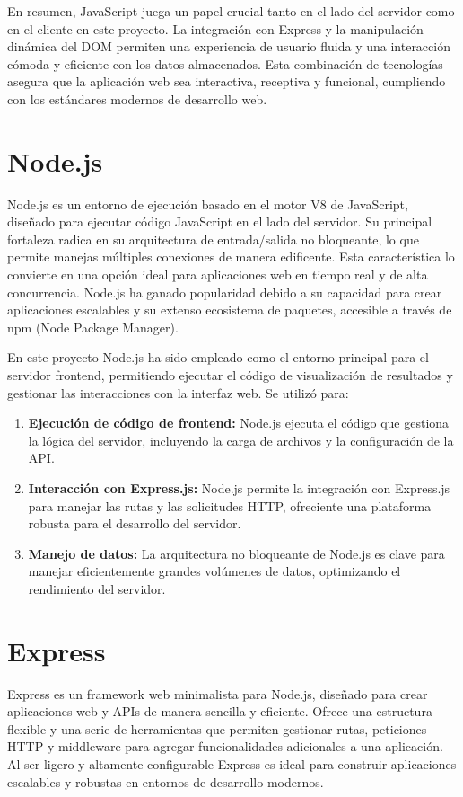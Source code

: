 \documentclass[a4paper, 12pt]{book}
\begin{document}
En resumen, JavaScript juega un papel crucial tanto en el lado del servidor como en el cliente en este proyecto. La integración con Express y la manipulación dinámica del DOM permiten una experiencia de usuario fluida y una interacción cómoda y eficiente con los datos almacenados. Esta combinación de tecnologías asegura que la aplicación web sea interactiva, receptiva y funcional, cumpliendo con los estándares modernos de desarrollo web.

\section{Node.js}
Node.js es un entorno de ejecución basado en el motor V8 de JavaScript, diseñado para ejecutar código JavaScript en el lado del servidor. Su principal fortaleza radica en su arquitectura de entrada/salida no bloqueante, lo que permite manejas múltiples conexiones de manera edificente. Esta característica lo convierte en una opción ideal para aplicaciones web en tiempo real y de alta concurrencia. Node.js ha ganado popularidad debido a su capacidad para crear aplicaciones escalables y su extenso ecosistema de paquetes, accesible a través de npm (Node Package Manager).

En este proyecto Node.js ha sido empleado como el entorno principal para el servidor frontend, permitiendo ejecutar el código de visualización de resultados y gestionar las interacciones con la interfaz web. Se utilizó para:

\begin{enumerate}
    \item \textbf{Ejecución de código de frontend:} Node.js ejecuta el código que gestiona la lógica del servidor, incluyendo la carga de archivos y la configuración de la API.
    \item \textbf{Interacción con Express.js:} Node.js permite la integración con Express.js para manejar las rutas y las solicitudes HTTP, ofreciente una plataforma robusta para el desarrollo del servidor.
    \item \textbf{Manejo de datos:} La arquitectura no bloqueante de Node.js es clave para manejar eficientemente grandes volúmenes de datos, optimizando el rendimiento del servidor.
\end{enumerate}

\section{Express}
Express es un framework web minimalista para Node.js, diseñado para crear aplicaciones web y APIs de manera sencilla y eficiente. Ofrece una estructura flexible y una serie de herramientas que permiten gestionar rutas, peticiones HTTP y middleware para agregar funcionalidades adicionales a una aplicación. Al ser ligero y altamente configurable Express es ideal para construir aplicaciones escalables y robustas en entornos de desarrollo modernos.
\end{document}

